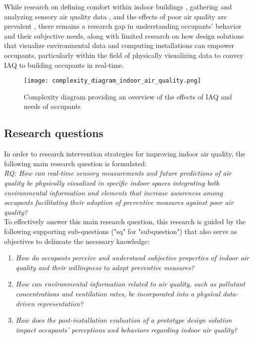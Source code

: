 While research on defining comfort within indoor buildings \cite{alavi_comfort_2017}, gathering and analyzing sensory air quality data \cite{corlan_importance_2021}, and the effects of poor air quality are prevalent \cite{klepeis_national_2001}, there remains a research gap in understanding occupants' behavior and their subjective needs, along with limited research on how design solutions that visualize environmental data and computing installations can empower occupants, particularly within the field of physically visualizing data to convey IAQ to building occupants in real-time. 

\begin{figure}[h]
    \centering
    \texttt{[image: complexity\_diagram\_indoor\_air\_quality.png]}
    \caption{Complexity diagram providing an overview of the effects of IAQ and needs of occupants \cite{schweizer_indoor_2007, wang_how_2021, kim_analyzing_2019, alavi_comfort_2017, corlan_importance_2021, klepeis_national_2001}}
    \label{fig:complexity}
\end{figure}


\subsection{Research questions}

In order to research intervention strategies for improving indoor air quality, the following main research question is formulated: \\

\emph{RQ: How can real-time sensory measurements and future predictions of air quality be physically visualized in specific indoor spaces integrating both environmental information and elements that increase awareness among occupants facilitating their adoption of preventive measures against poor air quality?}\label{rq:1} \\

To effectively answer this main research question, this research is guided by the following supporting sub-questions ("sq" for "subquestion") that also serve as objectives to delineate the necessary knowledge: \\


\begin{enumerate}
    \renewcommand{\labelenumi}{SQ\arabic{enumi}:}
    \item \emph{How do occupants perceive and understand subjective properties of indoor air quality and their willingness to adopt preventive measures?}\label{subq:1}
    \item \emph{How can environmental information related to air quality, such as pollutant concentrations and ventilation rates, be incorporated into a physical data-driven representation?}\label{subq:2}
    \item \emph{How does the post-installation evaluation of a prototype design solution impact occupants' perceptions and behaviors regarding indoor air quality?}\label{subq:3}\\
\end{enumerate}